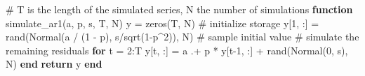 \documentclass[
  letterpaper,
  DIV=11,
  numbers=noendperiod]{scrartcl}
\newenvironment{Shaded}{\begin{snugshade}}{\end{snugshade}}
\newcommand{\CommentTok}[1]{\textcolor[rgb]{0.37,0.37,0.37}{#1}}
\newcommand{\ControlFlowTok}[1]{\textcolor[rgb]{0.00,0.23,0.31}{\textbf{#1}}}
\newcommand{\FloatTok}[1]{\textcolor[rgb]{0.68,0.00,0.00}{#1}}
\newcommand{\FunctionTok}[1]{\textcolor[rgb]{0.28,0.35,0.67}{#1}}
\newcommand{\KeywordTok}[1]{\textcolor[rgb]{0.00,0.23,0.31}{\textbf{#1}}}
\newcommand{\NormalTok}[1]{\textcolor[rgb]{0.00,0.23,0.31}{#1}}
\newcommand{\OperatorTok}[1]{\textcolor[rgb]{0.37,0.37,0.37}{#1}}
\begin{document}
\begin{Shaded}
\begin{Highlighting}[]
\CommentTok{\# T is the length of the simulated series, N the number of simulations}
\KeywordTok{function} \FunctionTok{simulate\_ar1}\NormalTok{(a, p, s, T, N)}
\NormalTok{    y }\OperatorTok{=} \FunctionTok{zeros}\NormalTok{(T, N) }\CommentTok{\# initialize storage}
\NormalTok{    y[}\FloatTok{1}\NormalTok{, }\OperatorTok{:}\NormalTok{] }\OperatorTok{=} \FunctionTok{rand}\NormalTok{(}\FunctionTok{Normal}\NormalTok{(a }\OperatorTok{/}\NormalTok{ (}\FloatTok{1} \OperatorTok{{-}}\NormalTok{ p), s}\OperatorTok{/}\FunctionTok{sqrt}\NormalTok{(}\FloatTok{1}\OperatorTok{{-}}\NormalTok{p}\OperatorTok{\^{}}\FloatTok{2}\NormalTok{)), N) }\CommentTok{\# sample initial value}
    \CommentTok{\# simulate the remaining residuals}
    \ControlFlowTok{for}\NormalTok{ t }\OperatorTok{=} \FloatTok{2}\OperatorTok{:}\NormalTok{T}
\NormalTok{        y[t, }\OperatorTok{:}\NormalTok{] }\OperatorTok{=}\NormalTok{ a }\OperatorTok{.+}\NormalTok{ p }\OperatorTok{*}\NormalTok{ y[t}\OperatorTok{{-}}\FloatTok{1}\NormalTok{, }\OperatorTok{:}\NormalTok{] }\OperatorTok{+} \FunctionTok{rand}\NormalTok{(}\FunctionTok{Normal}\NormalTok{(}\FloatTok{0}\NormalTok{, s), N)}
    \ControlFlowTok{end}
    \ControlFlowTok{return}\NormalTok{ y}
\KeywordTok{end}


\end{Highlighting}
\end{Shaded}
\end{document}
